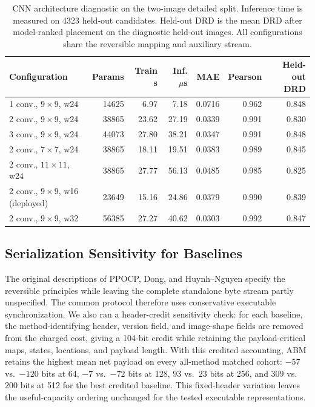 \documentclass[a4paper,fleqn]{cas-dc}
\begin{document}
\begin{table}[t]
\centering
\caption{CNN architecture diagnostic on the two-image detailed split. Inference
time is measured on 4323 held-out candidates. Held-out DRD is the mean DRD
after model-ranked placement on the diagnostic held-out images. All
configurations share the reversible mapping and auxiliary stream.}
\label{tab:cnn-architecture-ablation}
\begin{tabular*}{\textwidth}{@{\extracolsep{\fill}}lrrrrrr@{}}
\toprule
\textbf{Configuration} & \textbf{Params} & \textbf{Train s} &
\textbf{Inf. $\mu$s} & \textbf{MAE} & \textbf{Pearson} &
\textbf{Held-out DRD} \\
\midrule
1 conv., $9\times9$, w24 & 14625 & 6.97 & 7.18 & 0.0716 & 0.962 & 0.848 \\
2 conv., $9\times9$, w24 & 38865 & 23.62 & 27.19 & 0.0339 & 0.991 & 0.830 \\
3 conv., $9\times9$, w24 & 44073 & 27.80 & 38.21 & 0.0347 & 0.991 & 0.848 \\
2 conv., $7\times7$, w24 & 38865 & 18.11 & 19.51 & 0.0383 & 0.989 & 0.845 \\
2 conv., $11\times11$, w24 & 38865 & 27.77 & 56.13 & 0.0485 & 0.985 & 0.825 \\
2 conv., $9\times9$, w16 (deployed) & 23649 & 15.16 & 24.86 & 0.0379 & 0.990 & 0.839 \\
2 conv., $9\times9$, w32 & 56385 & 27.27 & 40.62 & 0.0303 & 0.992 & 0.847 \\
\bottomrule
\end{tabular*}
\end{table}

\subsection{Serialization Sensitivity for Baselines}

The original descriptions of PPOCP, Dong, and Huynh--Nguyen specify the
reversible principles while leaving the complete standalone byte stream partly
unspecified. The common protocol therefore uses conservative executable
synchronization. We also ran a header-credit sensitivity check: for each
baseline, the method-identifying header, version field, and image-shape fields
are removed from the charged cost, giving a 104-bit credit while retaining the
payload-critical maps, states, locations, and payload length. With this
credited accounting, ABM retains the highest mean net payload on every
all-method matched cohort: $-57$ vs.\ $-120$ bits at 64, $-7$ vs.\ $-72$ bits
at 128, $93$ vs.\ $23$ bits at 256, and $309$ vs.\ $200$ bits at 512 for the
best credited baseline. This fixed-header variation leaves the useful-capacity
ordering unchanged for the tested executable representations.
\end{document}

